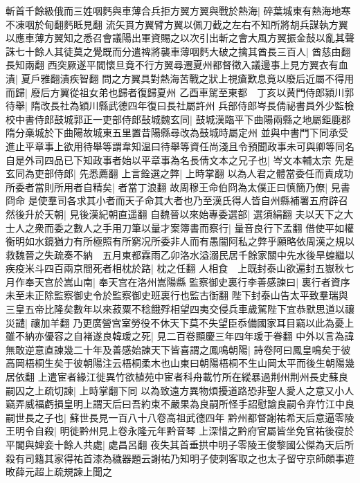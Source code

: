 斬首千餘級俄而三姓咽麫與車薄合兵拒方翼方翼與戰於熱海|{
	碎葉城東有熱海地寒不凍咽於甸翻麫眡見翻}
流矢貫方翼臂方翼以佩刀截之左右不知所將胡兵謀執方翼以應車薄方翼知之悉召會議陽出軍資賜之以次引出斬之會大風方翼振金鼔以亂其聲誅七十餘人其徒莫之覺既而分遣禆將襲車薄咽麫大破之擒其酋長三百人|{
	酋慈由翻長知兩翻}
西突厥遂平閻懷旦竟不行方翼尋遷夏州都督徵入議邊事上見方翼衣有血漬|{
	夏戶雅翻漬疾智翻}
問之方翼具對熱海苦戰之狀上視瘡歎息竟以廢后近屬不得用而歸|{
	廢后方翼從祖女弟也歸者復歸夏州}
乙酉車駕至東都　丁亥以黄門侍郎潁川郭待舉|{
	隋改長社為穎川縣武德四年復曰長社屬許州}
兵部侍郎岑長倩祕書員外少監檢校中書侍郎鼓城郭正一吏部侍郎鼔城魏玄同|{
	鼓城漢臨平下曲陽兩縣之地屬鉅鹿郡隋分槀城於下曲陽故城東五里置昔陽縣尋改為鼓城時屬定州}
並與中書門下同承受進止平章事上欲用待舉等謂韋知温曰待舉等資任尚淺且令預聞政事未可與卿等同名自是外司四品已下知政事者始以平章事為名長倩文本之兄子也|{
	岑文本輔太宗}
先是玄同為吏部侍郎|{
	先悉薦翻}
上言銓選之弊|{
	上時掌翻}
以為人君之體當委任而責成功所委者當則所用者自精矣|{
	者當丁浪翻}
故周穆王命伯冏為太僕正曰慎簡乃僚|{
	見書冏命}
是使羣司各求其小者而天子命其大者也乃至漢氏得人皆自州縣補署五府辟召然後升於天朝|{
	見後漢紀朝直遥翻}
自魏晉以來始專委選部|{
	選須絹翻}
夫以天下之大士人之衆而委之數人之手用刀筆以量才案簿書而察行|{
	量音良行下孟翻}
借使平如權衡明如水鏡猶力有所極照有所窮况所委非人而有愚闇阿私之弊乎願略依周漢之規以救魏晉之失疏奏不納　五月東都霖雨乙卯洛水溢溺民居千餘家關中先水後旱蝗繼以疾疫米斗四百兩京間死者相枕於路|{
	枕之任翻}
人相食　上既封泰山欲遍封五嶽秋七月作奉天宫於嵩山南|{
	奉天宫在洛州嵩陽縣}
監察御史裏行李善感諫曰|{
	裏行者資序未至未正除監察御史令於監察御史班裏行也監古衘翻}
陛下封泰山告太平致羣瑞與三皇五帝比隆矣數年以來菽粟不稔餓殍相望四夷交侵兵車歲駕陛下宜恭默思道以禳災譴|{
	禳加羊翻}
乃更廣營宫室勞役不休天下莫不失望臣忝備國家耳目竊以此為憂上雖不納亦優容之自褚遂良韓瑗之死|{
	見二百卷顯慶三年四年瑗于眷翻}
中外以言為諱無敢逆意直諫幾二十年及善感始諫天下皆喜謂之鳳鳴朝陽|{
	詩卷阿曰鳳皇鳴矣于彼高岡梧桐生矣于彼朝陽注云梧桐柔木也山東曰朝陽梧桐不生山岡太平而後生朝陽幾居依翻}
上遣宦者緣江徙異竹欲植苑中宦者科舟載竹所在縱暴過荆州荆州長史蘇良嗣囚之上疏切諫|{
	上時掌翻下同}
以為致遠方異物煩擾道路恐非聖人愛人之意又小人竊弄威福虧損皇明上謂天后曰吾約束不嚴果為良嗣所怪手詔慰諭良嗣令弃竹江中良嗣世長之子也|{
	蘇世長見一百八十八卷高祖武德四年}
黔州都督謝祐希天后意逼零陵王明令自殺|{
	明徙黔州見上卷永隆元年黔音琴}
上深惜之黔府官屬皆坐免官祐後寑於平閣與婢妾十餘人共處|{
	處昌呂翻}
夜失其首垂拱中明子零陵王俊黎國公傑為天后所殺有司籍其家得祐首漆為穢器題云謝祐乃知明子使刺客取之也太子留守京師頗事遊畋薛元超上疏規諫上聞之

